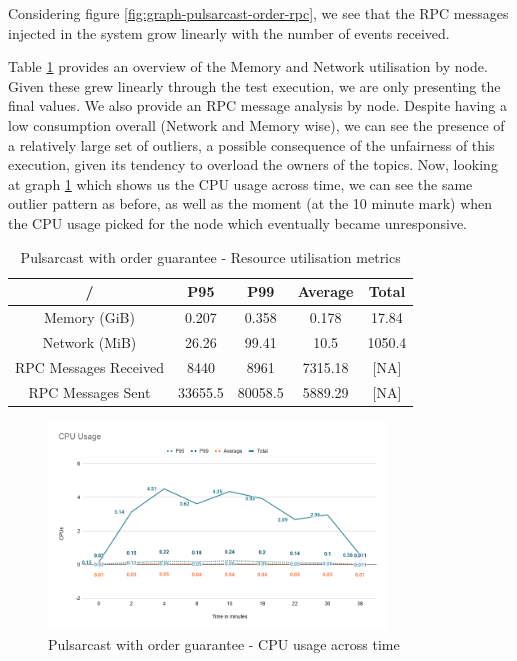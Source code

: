 Considering figure \ref{fig:graph-pulsarcast-order-rpc}, we see that the RPC
messages injected in the system grow linearly with the number of events
received.

Table \ref{table:pulsarcast-order} provides an overview of the Memory and
Network utilisation by node. Given these grew linearly through the test
execution, we are only presenting the final values. We also provide an RPC
message analysis by node. Despite having a low consumption overall (Network and
Memory wise), we can see the presence of a relatively large set of outliers, a
possible consequence of the unfairness of this execution, given its tendency to
overload the owners of the topics. Now, looking at graph
\ref{fig:graph-pulsarcast-order-cpu} which shows us the CPU usage across time,
we can see the same outlier pattern as before, as well as the moment (at the 10
minute mark) when the CPU usage picked for the node which eventually became
unresponsive.

\begin{table}[!htb]
\caption{Pulsarcast with order guarantee - Resource utilisation metrics}
\label{table:pulsarcast-order}
  \begin{center}
   \begin{tabular}{|c| c c c c|} 
   \hline
   / & P95 & P99 & Average & Total \\ [0.5ex] 
   \hline\hline
   Memory (GiB) & 0.207 & 0.358 & 0.178 & 17.84 \\
   \hline
   Network (MiB) & 26.26 & 99.41 & 10.5 & 1050.4 \\
   \hline
   RPC Messages Received & 8440 & 8961 & 7315.18 & [NA] \\
   \hline
   RPC Messages Sent & 33655.5 & 80058.5 & 5889.29 & [NA] \\ [1ex] 
   \hline
  \end{tabular}
  \end{center}
\end{table}

\begin{figure}[!htb]
  \centering
  \includegraphics[width=0.8\textwidth]{img/graph-pulsarcast-order-cpu.png}
  \caption{Pulsarcast with order guarantee - CPU usage across time}
  \label{fig:graph-pulsarcast-order-cpu}
\end{figure}

